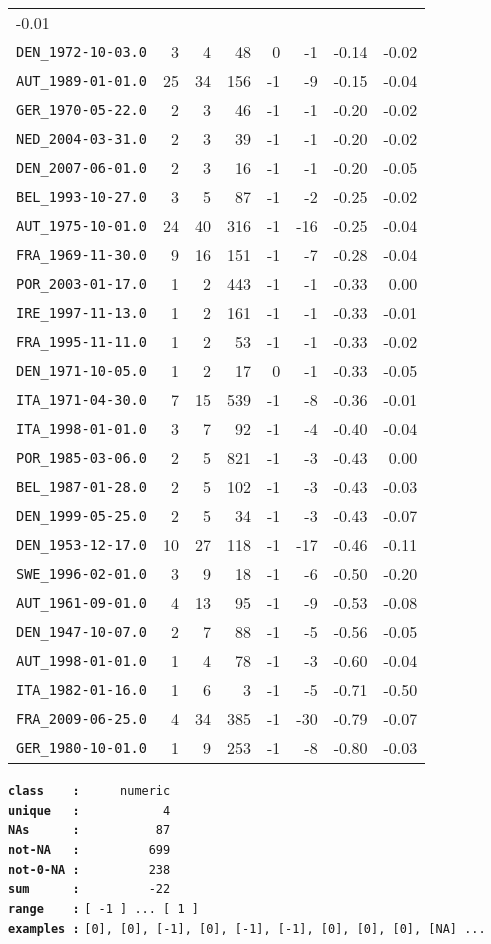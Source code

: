 \documentclass[]{article}
\begin{document}
\begin{longtable}[c]{@{}lrrrrrrr@{}}
-0.01\tabularnewline
\texttt{DEN\_1972-10-03.0} & 3 & 4 & 48 & 0 & -1 & -0.14 &
-0.02\tabularnewline
\texttt{AUT\_1989-01-01.0} & 25 & 34 & 156 & -1 & -9 & -0.15 &
-0.04\tabularnewline
\texttt{GER\_1970-05-22.0} & 2 & 3 & 46 & -1 & -1 & -0.20 &
-0.02\tabularnewline
\texttt{NED\_2004-03-31.0} & 2 & 3 & 39 & -1 & -1 & -0.20 &
-0.02\tabularnewline
\texttt{DEN\_2007-06-01.0} & 2 & 3 & 16 & -1 & -1 & -0.20 &
-0.05\tabularnewline
\texttt{BEL\_1993-10-27.0} & 3 & 5 & 87 & -1 & -2 & -0.25 &
-0.02\tabularnewline
\texttt{AUT\_1975-10-01.0} & 24 & 40 & 316 & -1 & -16 & -0.25 &
-0.04\tabularnewline
\texttt{FRA\_1969-11-30.0} & 9 & 16 & 151 & -1 & -7 & -0.28 &
-0.04\tabularnewline
\texttt{POR\_2003-01-17.0} & 1 & 2 & 443 & -1 & -1 & -0.33 &
0.00\tabularnewline
\texttt{IRE\_1997-11-13.0} & 1 & 2 & 161 & -1 & -1 & -0.33 &
-0.01\tabularnewline
\texttt{FRA\_1995-11-11.0} & 1 & 2 & 53 & -1 & -1 & -0.33 &
-0.02\tabularnewline
\texttt{DEN\_1971-10-05.0} & 1 & 2 & 17 & 0 & -1 & -0.33 &
-0.05\tabularnewline
\texttt{ITA\_1971-04-30.0} & 7 & 15 & 539 & -1 & -8 & -0.36 &
-0.01\tabularnewline
\texttt{ITA\_1998-01-01.0} & 3 & 7 & 92 & -1 & -4 & -0.40 &
-0.04\tabularnewline
\texttt{POR\_1985-03-06.0} & 2 & 5 & 821 & -1 & -3 & -0.43 &
0.00\tabularnewline
\texttt{BEL\_1987-01-28.0} & 2 & 5 & 102 & -1 & -3 & -0.43 &
-0.03\tabularnewline
\texttt{DEN\_1999-05-25.0} & 2 & 5 & 34 & -1 & -3 & -0.43 &
-0.07\tabularnewline
\texttt{DEN\_1953-12-17.0} & 10 & 27 & 118 & -1 & -17 & -0.46 &
-0.11\tabularnewline
\texttt{SWE\_1996-02-01.0} & 3 & 9 & 18 & -1 & -6 & -0.50 &
-0.20\tabularnewline
\texttt{AUT\_1961-09-01.0} & 4 & 13 & 95 & -1 & -9 & -0.53 &
-0.08\tabularnewline
\texttt{DEN\_1947-10-07.0} & 2 & 7 & 88 & -1 & -5 & -0.56 &
-0.05\tabularnewline
\texttt{AUT\_1998-01-01.0} & 1 & 4 & 78 & -1 & -3 & -0.60 &
-0.04\tabularnewline
\texttt{ITA\_1982-01-16.0} & 1 & 6 & 3 & -1 & -5 & -0.71 &
-0.50\tabularnewline
\texttt{FRA\_2009-06-25.0} & 4 & 34 & 385 & -1 & -30 & -0.79 &
-0.07\tabularnewline
\texttt{GER\_1980-10-01.0} & 1 & 9 & 253 & -1 & -8 & -0.80 &
-0.03\tabularnewline
\bottomrule
\end{longtable}

\textbf{\texttt{class\ \ \ \ :}} \texttt{~~~~~numeric}\\
\textbf{\texttt{unique\ \ \ :}} \texttt{~~~~~~~~~~~4}\\
\textbf{\texttt{NAs\ \ \ \ \ \ :}} \texttt{~~~~~~~~~~87}\\
\textbf{\texttt{not-NA\ \ \ :}} \texttt{~~~~~~~~~699}\\
\textbf{\texttt{not-0-NA\ :}} \texttt{~~~~~~~~~238}\\
\textbf{\texttt{sum\ \ \ \ \ \ :}} \texttt{~~~~~~~~~-22}\\
\textbf{\texttt{range\ \ \ \ :}}
\texttt{{[}\ -1\ {]}\ ...\ {[}\ 1\ {]}}\\
\textbf{\texttt{examples\ :}}
\texttt{{[}0{]},\ {[}0{]},\ {[}-1{]},\ {[}0{]},\ {[}-1{]},\ {[}-1{]},\ {[}0{]},\ {[}0{]},\ {[}0{]},\ {[}NA{]}\ ...}\\
\end{document}
